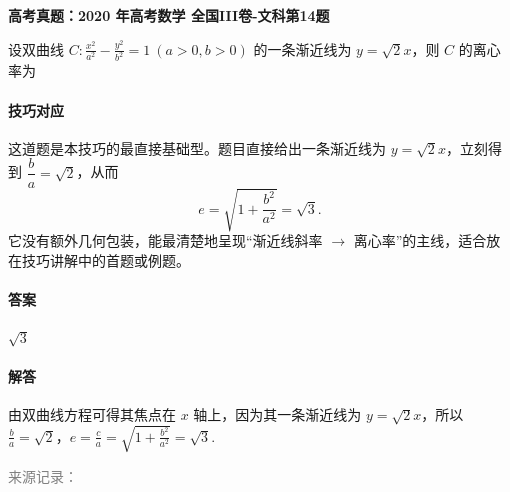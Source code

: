 \documentclass[UTF8,a4paper,11pt]{ctexart}
\newenvironment{gaokao}[1]{\par\medskip\noindent\textbf{高考真题：#1}\par\smallskip}{\par\medskip}
\begin{document}
\begin{gaokao}{2020 年高考数学 全国III卷-文科第14题}

设双曲线 $C:\frac{x^2}{a^2}-\frac{y^2}{b^2}=1\ (a>0,b>0)$ 的一条渐近线为 $y=\sqrt{2}x$，则 $C$ 的离心率为

\paragraph{技巧对应}

这道题是本技巧的最直接基础型。题目直接给出一条渐近线为 $y=\sqrt{2}x$，立刻得到 $\dfrac{b}{a}=\sqrt{2}$，从而
\[
e=\sqrt{1+\frac{b^2}{a^2}}=\sqrt{3}.
\]
它没有额外几何包装，能最清楚地呈现“渐近线斜率 $\to$ 离心率”的主线，适合放在技巧讲解中的首题或例题。

\paragraph{答案}

$\sqrt{3}$

\paragraph{解答}

由双曲线方程可得其焦点在 $x$ 轴上，因为其一条渐近线为 $y=\sqrt{2}x$，所以 $\frac{b}{a}=\sqrt{2}$，$e=\frac{c}{a}=\sqrt{1+\frac{b^2}{a^2}}=\sqrt{3}$.

\par\smallskip\textcolor{gray}{\footnotesize 来源记录：\texttt{}}

\end{gaokao}
\end{document}
